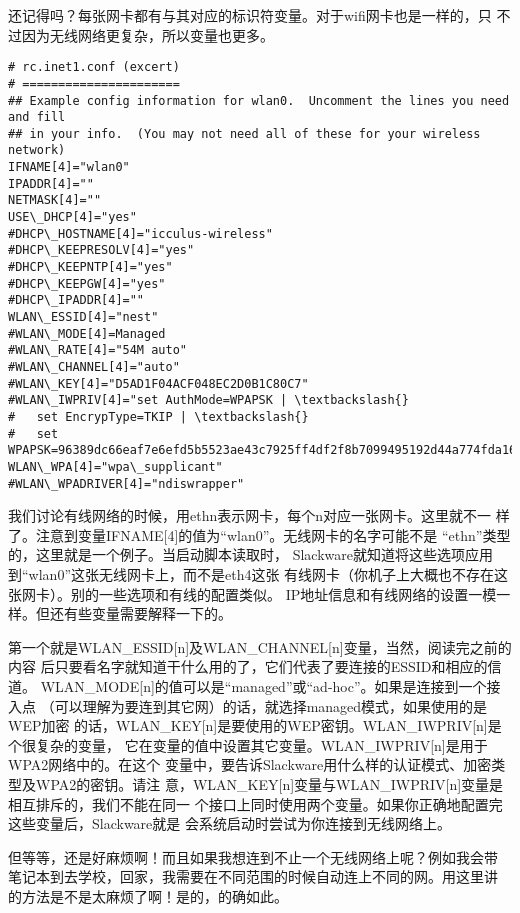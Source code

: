 还记得吗？每张网卡都有与其对应的标识符变量。对于wifi网卡也是一样的，只
不过因为无线网络更复杂，所以变量也更多。
\begin{Verbatim}[frame=single,commandchars=\\\{\}]
# rc.inet1.conf (excert)
# ======================
## Example config information for wlan0.  Uncomment the lines you need and fill
## in your info.  (You may not need all of these for your wireless network)
IFNAME[4]="wlan0"
IPADDR[4]=""
NETMASK[4]=""
USE\_DHCP[4]="yes"
#DHCP\_HOSTNAME[4]="icculus-wireless"
#DHCP\_KEEPRESOLV[4]="yes"
#DHCP\_KEEPNTP[4]="yes"
#DHCP\_KEEPGW[4]="yes"
#DHCP\_IPADDR[4]=""
WLAN\_ESSID[4]="nest"
#WLAN\_MODE[4]=Managed
#WLAN\_RATE[4]="54M auto"
#WLAN\_CHANNEL[4]="auto"
#WLAN\_KEY[4]="D5AD1F04ACF048EC2D0B1C80C7"
#WLAN\_IWPRIV[4]="set AuthMode=WPAPSK | \textbackslash{}
#   set EncrypType=TKIP | \textbackslash{}
#   set WPAPSK=96389dc66eaf7e6efd5b5523ae43c7925ff4df2f8b7099495192d44a774fda16"
WLAN\_WPA[4]="wpa\_supplicant"
#WLAN\_WPADRIVER[4]="ndiswrapper"
\end{Verbatim}
我们讨论有线网络的时候，用ethn表示网卡，每个n对应一张网卡。这里就不一
样了。注意到变量IFNAME[4]的值为``wlan0''。无线网卡的名字可能不是
``ethn''类型的，这里就是一个例子。当启动脚本读取时，
Slackware就知道将这些选项应用到``wlan0''这张无线网卡上，而不是eth4这张
有线网卡（你机子上大概也不存在这张网卡）。别的一些选项和有线的配置类似。
IP地址信息和有线网络的设置一模一样。但还有些变量需要解释一下的。

第一个就是WLAN\_ESSID[n]及WLAN\_CHANNEL[n]变量，当然，阅读完之前的内容
后只要看名字就知道干什么用的了，它们代表了要连接的ESSID和相应的信道。
WLAN\_MODE[n]的值可以是``managed''或``ad-hoc''。如果是连接到一个接入点
（可以理解为要连到其它网）的话，就选择managed模式，如果使用的是WEP加密
的话，WLAN\_KEY[n]是要使用的WEP密钥。WLAN\_IWPRIV[n]是个很复杂的变量，
它在变量的值中设置其它变量。WLAN\_IWPRIV[n]是用于WPA2网络中的。在这个
变量中，要告诉Slackware用什么样的认证模式、加密类型及WPA2的密钥。请注
意，WLAN\_KEY[n]变量与WLAN\_IWPRIV[n]变量是相互排斥的，我们不能在同一
个接口上同时使用两个变量。如果你正确地配置完这些变量后，Slackware就是
会系统启动时尝试为你连接到无线网络上。

但等等，还是好麻烦啊！而且如果我想连到不止一个无线网络上呢？例如我会带
笔记本到去学校，回家，我需要在不同范围的时候自动连上不同的网。用这里讲
的方法是不是太麻烦了啊！是的，的确如此。

